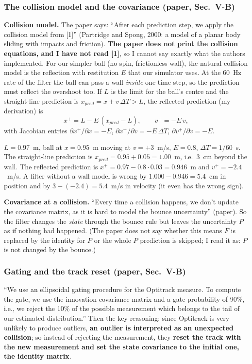 \documentclass[11pt,a4paper]{article}
\begin{document}
\subsubsection{The collision model and the covariance (paper, Sec.~V-B)}
\label{sec:cov}
\textbf{Collision model.} The paper says: ``After each prediction step, we apply the collision model
from [1]'' (Partridge and Spong, 2000: a model of a planar body sliding with impacts and friction).
\textbf{The paper does not print the collision equations, and I have not read [1]}, so I cannot
say exactly what the authors implemented. For our simpler ball (no spin, frictionless wall), the
natural collision model is the reflection with restitution $E$ that our simulator uses. At the
$60$~Hz rate of the filter the ball can pass a wall \emph{inside} one time step, so the prediction
must reflect the overshoot too. If $L$ is the limit for the ball's centre and the straight-line
prediction is $x_{pred}=x+v\,\Delta T>L$, the reflected prediction (my derivation) is
\[
x^+=L-E\,(x_{pred}-L),\qquad v^+=-E\,v,
\]
with Jacobian entries $\partial x^+/\partial x=-E$, $\partial x^+/\partial v=-E\,\Delta T$,
$\partial v^+/\partial v=-E$.

\begin{toy}
$L=0.97$~m, ball at $x=0.95$~m moving at $v=+3$~m/s, $E=0.8$, $\Delta T=1/60$~s. The straight-line
prediction is $x_{pred}=0.95+0.05=1.00$~m, i.e.\ $3$~cm beyond the wall. The reflected prediction is
$x^+=0.97-0.8\cdot0.03=0.946$~m and $v^+=-2.4$~m/s. A filter without a wall model is wrong by
$1.000-0.946=5.4$~cm in position and by $3-(-2.4)=\mathbf{5.4}$~m/s in velocity (it even has the
wrong sign).
\end{toy}

\textbf{Covariance at a collision.} ``Every time a collision happens, we don't update the
covariance matrix, as it is hard to model the bounce uncertainty'' (paper). So the filter changes
the \emph{state} through the bounce rule but leaves the uncertainty $P$ as if nothing had happened.
(The paper does not say whether this means $F$ is replaced by the identity for $P$ or the whole
$P$ prediction is skipped; I read it as: $P$ is not changed by the bounce.)

\subsubsection{Gating and the track reset (paper, Sec.~V-B)}
\label{sec:gate}
``We use an ellipsoidal gating procedure for the Optitrack measure. To compute the gate, we use the
innovation covariance matrix and a gate probability of 90\%, i.e., we reject the 10\% of the possible
measurement which belongs to the tail of our estimated distribution.'' Then the key reasoning: since
Optitrack is very unlikely to produce outliers, \textbf{an outlier is interpreted as an unexpected
collision}; so instead of rejecting the measurement, they \textbf{reset the track with the new
measurement and set the state covariance to the initial one, the identity matrix}.
\end{document}
